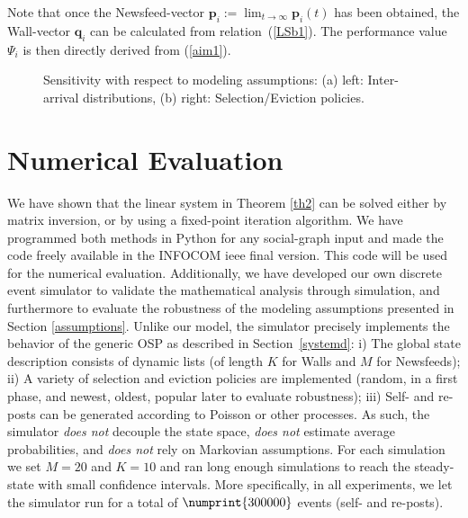 \documentclass[10pt, conference, letterpaper]{IEEEtran}
\newcommand{\red}[1]{\textcolor{red}{#1}}
\begin{document}
{%
Note that once the Newsfeed-vector $\mathbf{p}_i:=\lim_{t\rightarrow\infty}\mathbf{p}_i(t)$ has been obtained, the Wall-vector $\mathbf{q}_i$ can be calculated from relation~(\ref{LSb1}). The performance value $\Psi_i$ is then directly derived from (\ref{aim1}). 


\begin{figure}[t]
\centering
\caption{Sensitivity with respect to modeling assumptions: (a) left: Inter-arrival distributions, (b) right: Selection/Eviction policies.}
\label{robust fig}
\end{figure}

\section{Numerical Evaluation}
\label{numanal}


We have shown that the linear system in Theorem \ref{th2} can be solved either by matrix inversion, or by using a fixed-point iteration algorithm. We have programmed both methods in Python for any social-graph input and made the code freely available in the INFOCOM ieee final version. This code will be used for the numerical evaluation. Additionally, we have developed our own discrete event simulator to validate the mathematical analysis through simulation, and furthermore to evaluate the robustness of the modeling assumptions presented in Section \ref{assumptions}. Unlike our model, the simulator precisely implements the behavior of the generic OSP as described in Section~\ref{systemd}: i) The global state description consists of dynamic lists (of length $K$ for Walls and $M$ for Newsfeeds); ii) A variety of selection and eviction policies are implemented (random, in a first phase, and newest, oldest, popular later to evaluate robustness); iii) Self- and re-posts can be generated according to Poisson or other processes. As such, the simulator \textit{does not} decouple the state space, \textit{does not} estimate average probabilities, and \textit{does not} rely on Markovian assumptions.
For each simulation we set $M=20$ and $K=10$ and ran long enough simulations to reach the steady-state with small confidence intervals. %
More specifically, in all experiments, we let the simulator run for a total of $\numprint{300000}$ events (self- and re-posts). %
	
}
\end{document}
